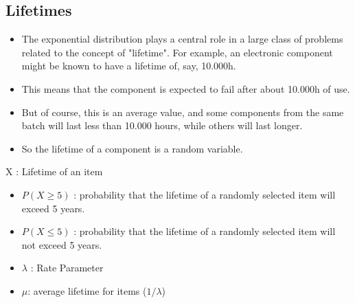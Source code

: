 \documentclass[a4paper,12pt]{article}
\begin{document}
\subsection*{Lifetimes}
\begin{itemize}
	\item The exponential distribution plays a central role in a large class of problems related to the concept of "lifetime". 
	For example, an electronic component might be known to have a lifetime of, say, 10.000h. 
	\item This means that the component is expected to fail after about 10.000h of use. 
	\item But of course, this is an average value, and some components from the same batch will last less than 10.000 hours, while others will last longer. 
	\item So the lifetime of a component is a random variable.
\end{itemize}


%
%

\begin{framed}

\noindent X : Lifetime of an item

\begin{itemize}
\item $P(X \geq 5)$ : probability that the lifetime of a randomly selected item will exceed 5 years.

\item$P(X \leq 5)$ : probability that the lifetime of a randomly selected item will not exceed 5 years.

\item $\lambda$ : Rate Parameter 
\item $\mu$: average lifetime for items ($1/\lambda$)
\end{itemize}
\end{framed}




%
%
%	
%
%
\end{document}
